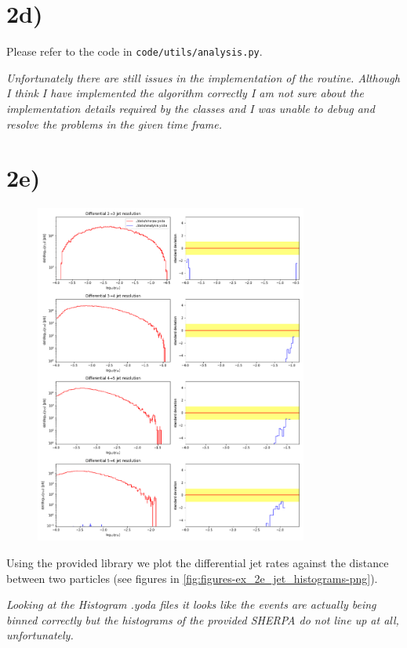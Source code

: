 \documentclass[12pt,a4paper]{scrartcl}
\begin{document}
\section*{2d)}
Please refer to the code in \lstinline{code/utils/analysis.py}.

\vspace{20pt}

\emph{
    Unfortunately there are still issues in the implementation of the routine.
    Although I think I have implemented the algorithm correctly I am not sure about the implementation details required by the classes and I was unable to debug and resolve the problems in the given time frame.
}

\section*{2e)}


\begin{figure}[htpb]
    \centering
    \includegraphics[width=0.8\textwidth]{figures/ex_2e_jet_histograms.png}
    \label{fig:figures-ex_2e_jet_histograms-png}
\end{figure}

Using the provided library we plot the differential jet rates against the distance between two particles (see figures in \eqref{fig:figures-ex_2e_jet_histograms-png}).

\vspace{20pt}

\emph{
    Looking at the Histogram .yoda files it looks like the events are actually being binned correctly but the histograms of the provided SHERPA
    do not line up at all, unfortunately.
}
\end{document}
